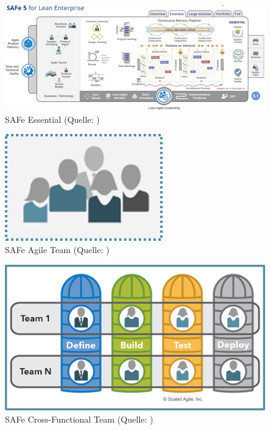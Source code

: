 \begin{figure}[htb]
	\centering
	\includegraphics[width=\textwidth]{img/safe.png}
	\caption[SAFe Essential (Quelle: \cite{SAFe})]{SAFe Essential (Quelle: \cite{SAFe})}
	\label{fig:SAFeEssential}
\end{figure}

\begin{figure}[htb]
	\centering
	\includegraphics[width=\textwidth]{img/agileTeam.png}
	\caption[SAFe Agile Team (Quelle: \cite{SAFe})]{SAFe Agile Team (Quelle: \cite{SAFe})}
	\label{fig:SAFeAgileTeam}
\end{figure}

\begin{figure}[htb]
	\centering
	\includegraphics[width=\textwidth]{img/CrossFunctionalTeam.png}
	\caption[SAFe Cross-Functional Team (Quelle: \cite{SAFe})]{SAFe Cross-Functional Team (Quelle: \cite{SAFe})}
	\label{fig:SAFeCrossFunc}
\end{figure}

